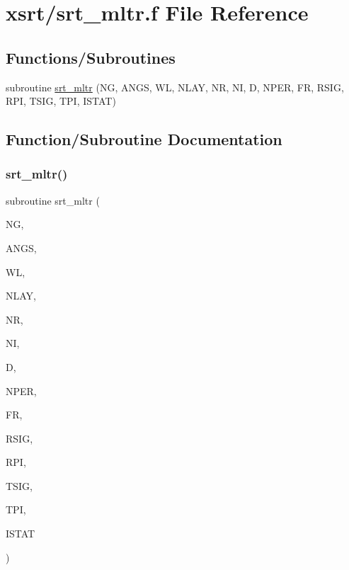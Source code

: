 \hypertarget{srt__mltr_8f}{}\section{xsrt/srt\+\_\+mltr.f File Reference}
\label{srt__mltr_8f}
\subsection*{Functions/\+Subroutines}
\begin{DoxyCompactItemize}
\item 
subroutine \hyperlink{srt__mltr_8f_a166732d3e92ca7503fbce86b3f90157a}{srt\+\_\+mltr} (NG, A\+N\+GS, WL, N\+L\+AY, NR, NI, D, N\+P\+ER, FR, R\+S\+IG, R\+PI, T\+S\+IG, T\+PI, I\+S\+T\+AT)
\end{DoxyCompactItemize}


\subsection{Function/\+Subroutine Documentation}
\mbox{\label{srt__mltr_8f_a166732d3e92ca7503fbce86b3f90157a}} 
\subsubsection{\texorpdfstring{srt\+\_\+mltr()}{srt\_mltr()}}
{\footnotesize\ttfamily subroutine srt\+\_\+mltr (\begin{DoxyParamCaption}\item[{integer}]{NG,  }\item[{double precision, dimension(ng)}]{A\+N\+GS,  }\item[{double precision}]{WL,  }\item[{integer}]{N\+L\+AY,  }\item[{double precision, dimension(nlay)}]{NR,  }\item[{double precision, dimension(nlay)}]{NI,  }\item[{double precision, dimension(nlay)}]{D,  }\item[{integer}]{N\+P\+ER,  }\item[{double complex, dimension(nlay)}]{FR,  }\item[{double precision, dimension(ng)}]{R\+S\+IG,  }\item[{double precision, dimension(ng)}]{R\+PI,  }\item[{double precision, dimension(ng)}]{T\+S\+IG,  }\item[{double precision, dimension(ng)}]{T\+PI,  }\item[{integer}]{I\+S\+T\+AT }\end{DoxyParamCaption})}

